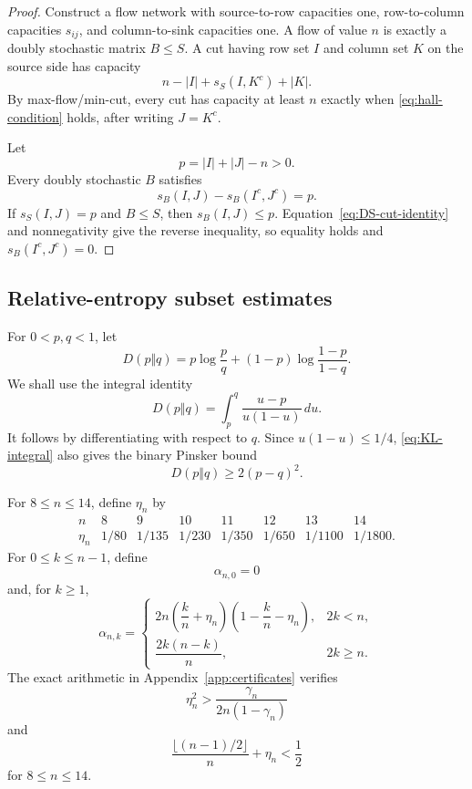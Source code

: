 \documentclass[11pt]{article}
\theoremstyle{definition}
\newcommand{\1}{\mathbf{1}}
\begin{document}
\begin{proof}
Construct a flow network with source-to-row capacities one, row-to-column capacities $s_{ij}$, and column-to-sink capacities one.  A flow of value $n$ is exactly a doubly stochastic matrix $B\le S$.  A cut having row set $I$ and column set $K$ on the source side has capacity
\[
 n-|I|+s_S(I,K^c)+|K|.
\]
By max-flow/min-cut, every cut has capacity at least $n$ exactly when \eqref{eq:hall-condition} holds, after writing $J=K^c$.

Let
\[
 p=|I|+|J|-n>0.
\]
Every doubly stochastic $B$ satisfies
\[
 s_B(I,J)-s_B(I^c,J^c)=p.
 \tag{5.6}\label{eq:DS-cut-identity}
\]
If $s_S(I,J)=p$ and $B\le S$, then $s_B(I,J)\le p$.  Equation~\eqref{eq:DS-cut-identity} and nonnegativity give the reverse inequality, so equality holds and $s_B(I^c,J^c)=0$.
\end{proof}

\subsection{Relative-entropy subset estimates}

For $0<p,q<1$, let
\[
 D(p\Vert q)=p\log\frac pq+(1-p)\log\frac{1-p}{1-q}.
\]
We shall use the integral identity
\[
 D(p\Vert q)=\int_p^q\frac{u-p}{u(1-u)}\,du.
 \tag{5.7}\label{eq:KL-integral}
\]
It follows by differentiating with respect to $q$.  Since $u(1-u)\le1/4$, \eqref{eq:KL-integral} also gives the binary Pinsker bound
\[
 D(p\Vert q)\ge2(p-q)^2.
 \tag{5.8}\label{eq:pinsker}
\]

For $8\le n\le14$, define $\eta_n$ by
\[
\begin{array}{c|ccccccc}
 n&8&9&10&11&12&13&14\\ \hline
 \eta_n&1/80&1/135&1/230&1/350&1/650&1/1100&1/1800.
\end{array}
\tag{5.9}\label{eq:eta-table}
\]
For $0\le k\le n-1$, define
\[
 \alpha_{n,0}=0
\]
and, for $k\ge1$,
\[
 \alpha_{n,k}=
 \begin{cases}
  2n\left(\dfrac{k}{n}+\eta_n\right)
     \left(1-\dfrac{k}{n}-\eta_n\right),&2k<n,\\[3mm]
  \dfrac{2k(n-k)}n,&2k\ge n.
 \end{cases}
 \tag{5.10}\label{eq:alpha-mid}
\]
The exact arithmetic in Appendix~\ref{app:certificates} verifies
\[
 \eta_n^2>\frac{\gamma_n}{2n(1-\gamma_n)}
 \tag{5.11}\label{eq:eta-localization}
\]
and
\[
 \frac{\lfloor(n-1)/2\rfloor}{n}+\eta_n<\frac12
 \tag{5.12}\label{eq:eta-half}
\]
for $8\le n\le14$.
\end{document}
